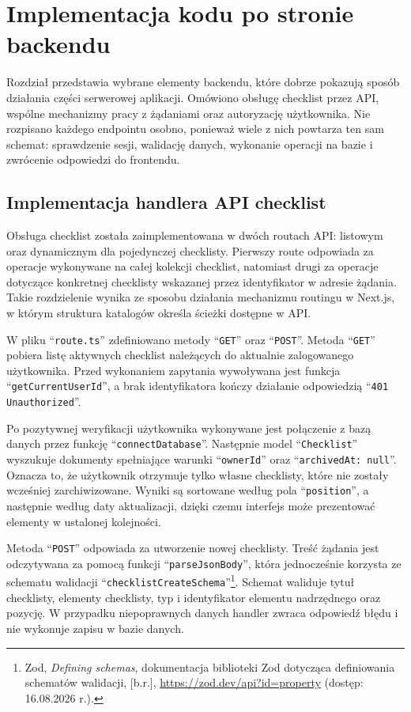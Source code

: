 \documentclass[12pt,a4paper,twoside]{report}
\newcommand{\FirstParagraph}{\noindent\ignorespaces}
\begin{document}
\chapter{Implementacja kodu po stronie backendu}

\FirstParagraph Rozdział przedstawia wybrane elementy backendu, które dobrze pokazują sposób działania części serwerowej aplikacji. Omówiono obsługę checklist przez API, wspólne mechanizmy pracy z żądaniami oraz autoryzację użytkownika. Nie rozpisano każdego endpointu osobno, ponieważ wiele z nich powtarza ten sam schemat: sprawdzenie sesji, walidację danych, wykonanie operacji na bazie i zwrócenie odpowiedzi do frontendu.

\section{Implementacja handlera API checklist}

\FirstParagraph Obsługa checklist została zaimplementowana w dwóch routach API: listowym oraz dynamicznym dla pojedynczej checklisty. Pierwszy route odpowiada za operacje wykonywane na całej kolekcji checklist, natomiast drugi za operacje dotyczące konkretnej checklisty wskazanej przez identyfikator w adresie żądania. Takie rozdzielenie wynika ze sposobu działania mechanizmu routingu w Next.js, w którym struktura katalogów określa ścieżki dostępne w API.

W pliku ``\texttt{route.ts}'' zdefiniowano metody ``\texttt{GET}'' oraz ``\texttt{POST}''. Metoda ``\texttt{GET}'' pobiera listę aktywnych checklist należących do aktualnie zalogowanego użytkownika. Przed wykonaniem zapytania wywoływana jest funkcja ``\texttt{getCurrentUserId}'', a brak identyfikatora kończy działanie odpowiedzią ``\texttt{401 Unauthorized}''.

Po pozytywnej weryfikacji użytkownika wykonywane jest połączenie z bazą danych przez funkcję ``\texttt{connectDatabase}''. Następnie model ``\texttt{Checklist}'' wyszukuje dokumenty spełniające warunki ``\texttt{ownerId}'' oraz ``\texttt{archivedAt: null}''. Oznacza to, że użytkownik otrzymuje tylko własne checklisty, które nie zostały wcześniej zarchiwizowane. Wyniki są sortowane według pola ``\texttt{position}'', a następnie według daty aktualizacji, dzięki czemu interfejs może prezentować elementy w ustalonej kolejności.

Metoda ``\texttt{POST}'' odpowiada za utworzenie nowej checklisty. Treść żądania jest odczytywana za pomocą funkcji ``\texttt{parseJsonBody}'', która jednocześnie korzysta ze schematu walidacji ``\texttt{checklistCreateSchema}''\footnote{Zod, \emph{Defining schemas}, dokumentacja biblioteki Zod dotycząca definiowania schematów walidacji, [b.r.], \url{https://zod.dev/api?id=property} (dostęp: 16.08.2026 r.).}. Schemat waliduje tytuł checklisty, elementy checklisty, typ i identyfikator elementu nadrzędnego oraz pozycję. W przypadku niepoprawnych danych handler zwraca odpowiedź błędu i nie wykonuje zapisu w bazie danych.
\end{document}
